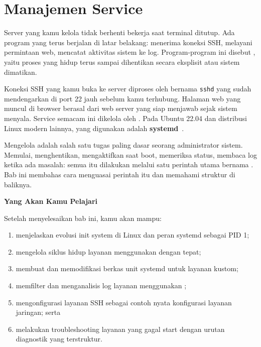 
\chapter{Manajemen Service}
\label{ch:service-management}


Server yang kamu kelola tidak berhenti bekerja saat terminal ditutup. Ada program yang
terus berjalan di latar belakang: menerima koneksi SSH, melayani permintaan web, mencatat
aktivitas sistem ke log. Program-program ini disebut , yaitu proses yang
hidup terus sampai dihentikan secara eksplisit atau sistem dimatikan.

Koneksi SSH yang kamu buka ke server diproses oleh  bernama \texttt{sshd}
yang sudah mendengarkan di port 22 jauh sebelum kamu terhubung. Halaman web yang muncul
di browser berasal dari  web server yang siap menjawab sejak sistem menyala.
Service semacam ini dikelola oleh . Pada Ubuntu 22.04 dan distribusi
Linux modern lainnya,  yang digunakan adalah \textbf{systemd}~\cite{systemd2024}.

Mengelola  adalah salah satu tugas paling dasar seorang administrator sistem. Memulai, menghentikan, mengaktifkan saat boot, memeriksa status, membaca log ketika ada masalah: semua itu dilakukan melalui satu perintah utama bernama . Bab ini membahas cara menguasai perintah itu dan memahami struktur di baliknya.

\textbf{Yang Akan Kamu Pelajari}

Setelah menyelesaikan bab ini, kamu akan mampu:

\begin{enumerate}
    \item menjelaskan evolusi init system di Linux dan peran systemd sebagai PID 1;
    \item mengelola siklus hidup layanan menggunakan  dengan tepat;
    \item membuat dan memodifikasi berkas unit systemd untuk layanan kustom;
    \item memfilter dan menganalisis log layanan menggunakan ;
    \item mengonfigurasi layanan SSH sebagai contoh nyata konfigurasi layanan jaringan; serta
    \item melakukan troubleshooting layanan yang gagal start dengan urutan diagnostik yang terstruktur.
\end{enumerate}

